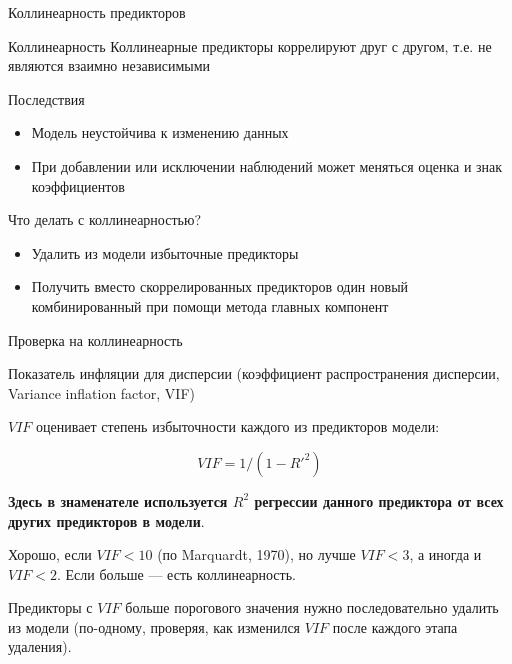 \documentclass[
  ignorenonframetext,
  t,xcolor=table]{beamer}
\providecommand{\tightlist}{%
  \setlength{\itemsep}{0pt}\setlength{\parskip}{0pt}}
\begin{document}
\begin{frame}{Коллинеарность предикторов}
\protect\hypertarget{ux43aux43eux43bux43bux438ux43dux435ux430ux440ux43dux43eux441ux442ux44c-ux43fux440ux435ux434ux438ux43aux442ux43eux440ux43eux432}{}
\begin{block}{Коллинеарность}
Коллинеарные предикторы коррелируют друг с другом, т.е. не являются взаимно независимыми
\end{block}

Последствия

\begin{itemize}
\tightlist
\item
  Модель неустойчива к изменению данных
\item
  При добавлении или исключении наблюдений может меняться оценка и знак
  коэффициентов
\end{itemize}

Что делать с коллинеарностью?

\begin{itemize}
\tightlist
\item
  Удалить из модели избыточные предикторы
\item
  Получить вместо скоррелированных предикторов один новый
  комбинированный при помощи метода главных компонент
\end{itemize}
\end{frame}

\begin{frame}{Проверка на коллинеарность}
\protect\hypertarget{ux43fux440ux43eux432ux435ux440ux43aux430-ux43dux430-ux43aux43eux43bux43bux438ux43dux435ux430ux440ux43dux43eux441ux442ux44c}{}
\begin{block}{Показатель инфляции для дисперсии}
\protect\hypertarget{ux43fux43eux43aux430ux437ux430ux442ux435ux43bux44c-ux438ux43dux444ux43bux44fux446ux438ux438-ux434ux43bux44f-ux434ux438ux441ux43fux435ux440ux441ux438ux438}{}
(коэффициент распространения дисперсии, Variance inflation factor, VIF)

\(VIF\) оценивает степень избыточности каждого из предикторов модели:

\[VIF = 1/(1-R'^2)\]

\textbf{Здесь в знаменателе используется \(R^2\) регрессии данного
предиктора от всех других предикторов в модели}.

Хорошо, если \(VIF < 10\) (по Marquardt, 1970), но лучше \(VIF < 3\), а
иногда и \(VIF < 2\). Если больше --- есть коллинеарность.

Предикторы с \(VIF\) больше порогового значения нужно последовательно
удалить из модели (по-одному, проверяя, как изменился \(VIF\) после
каждого этапа удаления).
\end{block}
\end{frame}
\end{document}
